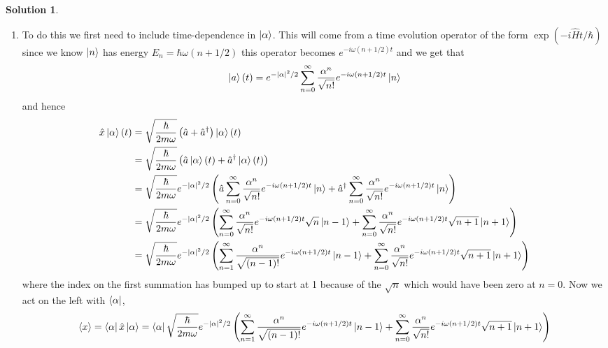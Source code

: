 \documentclass[10pt]{article}
\theoremstyle{definition}
\newtheorem{soln}{Solution}
\begin{document}
\begin{soln}
  \begin{enumerate}[label=(\alph*)]
    \item To do this we first need to include time-dependence in $\ket{\alpha}$. This will come from
          a time evolution operator of the form $\exp(-i\hat{H}t/\hbar)$ since we know
          $\ket{n}$ has energy $E_n=\hbar\omega(n+1/2)$ this operator becomes
          $e^{-i\omega(n+1/2)t}$ and we get that
          $$\ket{a}(t)=e^{-\abs{\alpha}^2/2}\sum_{n=0}^\infty\frac{\alpha^n}{\sqrt{n!}}e^{-i\omega(n+1/2)t}\ket{n}$$
          and hence
          \begin{align*}
            \hat{x}\ket{\alpha}(t) & = \sqrt{\frac{\hbar}{2m\omega}}\left(\hat{a}+\hat{a}^\dagger\right)\ket{\alpha}(t)                                                                                                                                                    \\
                                   & = \sqrt{\frac{\hbar}{2m\omega}}\left(\hat{a}\ket{\alpha}(t)+\hat{a}^\dagger \ket{\alpha}(t)\right)                                                                                                                                    \\
                                   & = \sqrt{\frac{\hbar}{2m\omega}}e^{-\abs{\alpha}^2/2}\left(\hat{a}\sum_{n=0}^\infty\frac{\alpha^n}{\sqrt{n!}}e^{-i\omega(n+1/2)t}\ket{n}+\hat{a}^\dagger \sum_{n=0}^\infty\frac{\alpha^n}{\sqrt{n!}}e^{-i\omega(n+1/2)t}\ket{n}\right) \\
                                   & = \sqrt{\frac{\hbar}{2m\omega}}e^{-\abs{\alpha}^2/2}\left(\sum_{n=0}^\infty\frac{\alpha^n}{\sqrt{n!}}e^{-i\omega(n+1/2)t}\sqrt{n}\ket{n-1}+\sum_{n=0}^\infty\frac{\alpha^n}{\sqrt{n!}}e^{-i\omega(n+1/2)t}\sqrt{n+1}\ket{n+1}\right)  \\
                                   & = \sqrt{\frac{\hbar}{2m\omega}}e^{-\abs{\alpha}^2/2}\left(\sum_{n=1}^\infty\frac{\alpha^n}{\sqrt{(n-1)!}}e^{-i\omega(n+1/2)t}\ket{n-1}+\sum_{n=0}^\infty\frac{\alpha^n}{\sqrt{n!}}e^{-i\omega(n+1/2)t}\sqrt{n+1}\ket{n+1}\right)
          \end{align*}
          where the index on the first summation has bumped up to start at 1 because of the $\sqrt{n}$ which would have been zero at $n=0$. Now we act on the left with
          $\bra{\alpha}$,
          \begin{align*}
            \expval{x}=\bra{\alpha}\hat{x}\ket{\alpha} & =\bra{\alpha}\sqrt{\frac{\hbar}{2m\omega}}e^{-\abs{\alpha}^2/2}\left(\sum_{n=1}^\infty\frac{\alpha^n}{\sqrt{(n-1)!}}e^{-i\omega(n+1/2)t}\ket{n-1}+\sum_{n=0}^\infty\frac{\alpha^n}{\sqrt{n!}}e^{-i\omega(n+1/2)t}\sqrt{n+1}\ket{n+1}\right) \\

\end{align*}
\end{enumerate}
\end{soln}
\end{document}

